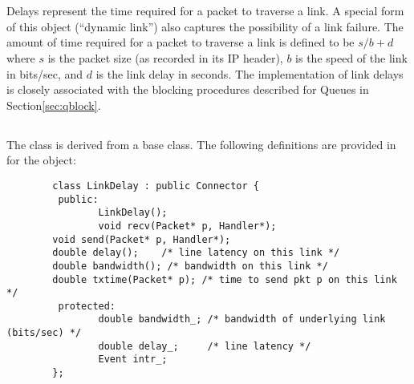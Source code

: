 %
%
\section{}

Delays represent the time required for a packet to
traverse a link.
A special form of this object (``dynamic link'')
also captures the possibility of a link failure.
The amount of time required for a packet to traverse a link
is defined to be $s/b + d$ where $s$ is the packet size
(as recorded in its IP header), $b$ is the speed of the link
in bits/sec, and $d$ is the link delay in seconds.
The implementation of link delays is closely associated with
the blocking procedures described for Queues in
Section\ref{sec:qblock}.

\subsection{}

The  class is derived from a
 base class.
The following definitions are provided in 
for the  object:
\begin{small}
\begin{verbatim}
        class LinkDelay : public Connector {
         public:
                LinkDelay();
                void recv(Packet* p, Handler*);
		void send(Packet* p, Handler*);
		double delay();    /* line latency on this link */
		double bandwidth(); /* bandwidth on this link */
		double txtime(Packet* p); /* time to send pkt p on this link */
         protected:
                double bandwidth_; /* bandwidth of underlying link (bits/sec) */
                double delay_;     /* line latency */
                Event intr_;
        };

\end{verbatim}
\end{small}

